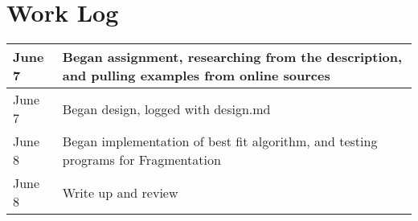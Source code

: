 \documentclass[onecolumn, draftclsnofoot,10pt, compsoc]{IEEEtran}
\begin{document}
\section{Work Log}
\begin{tabular}{|l|l|}
\hline
     June 7 & Began assignment, researching from the description, and pulling examples from online sources\\\hline
     June 7 & Began design, logged with design.md\\\hline
     June 8 & Began implementation of best fit algorithm, and testing programs for Fragmentation\\\hline
     June 8 & Write up and review \\ \hline

\end{tabular}

\newpage
\end{document}
